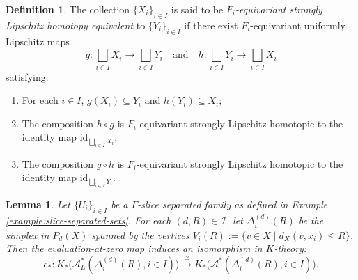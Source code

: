 \documentclass[pdflatex]{sn-jnl}
\theoremstyle{plain}
\newtheorem{lemma}[theorem]{Lemma}
\theoremstyle{definition}
\newtheorem{definition}[theorem]{Definition}
\begin{document}
\begin{definition}\label{def:collections-homotopy-equivalent}The collection $\{X_i\}_{i\in I}$ is said to be \emph{$F_i$-equivariant strongly Lipschitz homotopy equivalent} to $\{Y_i\}_{i\in I}$ if there exist $F_i$-equivariant uniformly Lipschitz maps 
\[g:\bigsqcup_{i\in I} X_i\to\bigsqcup_{i\in I}Y_i\quad\text{and}\quad h:\bigsqcup_{i\in I}Y_i\to\bigsqcup_{i\in I}X_i\]
satisfying:
\begin{enumerate}
\item [(1)] For each $i\in I$, $g(X_i)\subseteq Y_i$ and $h(Y_i)\subseteq X_i$;
\item [(2)] The composition $h\circ g$ is $F_i$-equivariant strongly Lipschitz homotopic to the identity map $\mathrm{id}_{\bigsqcup_{i\in I} X_i}$;
\item [(3)] The composition $g\circ h $ is $F_i$-equivariant strongly Lipschitz homotopic to the identity map $\mathrm{id}_{\bigsqcup_{i\in I} Y_i}$.
\end{enumerate}
\end{definition}
\begin{lemma}\label{lemma:simplex-evaluation-isomorphism}
Let $\{U_{i}\}_{i\in I}$ be a $\Gamma$-slice separated family as defined in Example \ref{example:slice-separated-sets}. For each $(d,R)\in\mathcal I$, let $\Delta_i^{(d)}(R)$ be the simplex in $P_{d}(X)$ spanned by the vertices 
$V_i(R):=\{v\in X\mid d_X(v,x_i)\leq R\}$.
Then the evaluation-at-zero map induces an isomorphism in $K$-theory:
\begin{equation*}e_{*}:K_{*}\bigl(\mathcal{A}^{*}_{L}(\Delta_i^{(d)}(R), i\in I)\bigr)
\xrightarrow{\cong}
K_{*}\bigl(\mathcal{A}^{*}(\Delta_i^{(d)}(R), i\in I)\bigr).
\end{equation*}
\end{lemma}
\end{document}
